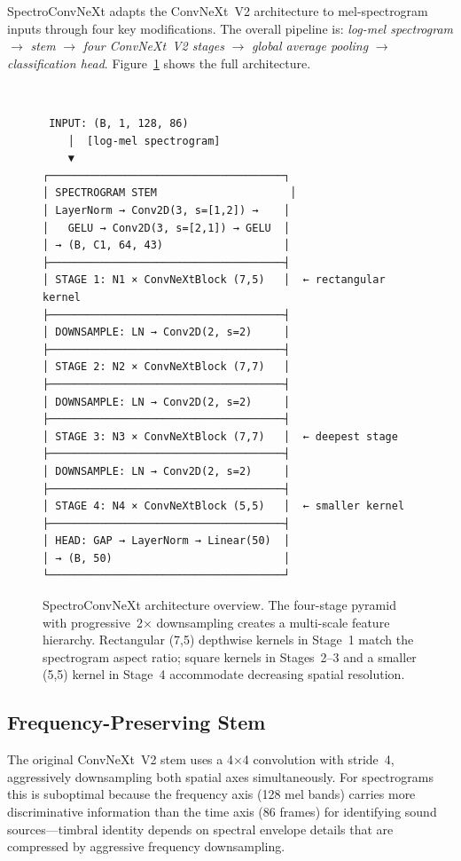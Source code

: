 \documentclass{article}
\begin{document}
SpectroConvNeXt adapts the ConvNeXt~V2 architecture to mel-spectrogram inputs
through four key modifications. The overall pipeline is: \emph{log-mel
spectrogram} $\rightarrow$ \emph{stem} $\rightarrow$ \emph{four ConvNeXt~V2
stages} $\rightarrow$ \emph{global average pooling} $\rightarrow$
\emph{classification head}. Figure~\ref{fig:arch} shows the full architecture.

\begin{figure}[h]
  \centering
  \begin{minipage}{0.92\linewidth}
  \small\tt
  \begin{verbatim}
 INPUT: (B, 1, 128, 86)
    │  [log-mel spectrogram]
    ▼
┌─────────────────────────────────────┐
│ SPECTROGRAM STEM                     │
│ LayerNorm → Conv2D(3, s=[1,2]) →    │
│   GELU → Conv2D(3, s=[2,1]) → GELU  │
│ → (B, C1, 64, 43)                   │
├─────────────────────────────────────┤
│ STAGE 1: N1 × ConvNeXtBlock (7,5)   │  ← rectangular kernel
├─────────────────────────────────────┤
│ DOWNSAMPLE: LN → Conv2D(2, s=2)     │
├─────────────────────────────────────┤
│ STAGE 2: N2 × ConvNeXtBlock (7,7)   │
├─────────────────────────────────────┤
│ DOWNSAMPLE: LN → Conv2D(2, s=2)     │
├─────────────────────────────────────┤
│ STAGE 3: N3 × ConvNeXtBlock (7,7)   │  ← deepest stage
├─────────────────────────────────────┤
│ DOWNSAMPLE: LN → Conv2D(2, s=2)     │
├─────────────────────────────────────┤
│ STAGE 4: N4 × ConvNeXtBlock (5,5)   │  ← smaller kernel
├─────────────────────────────────────┤
│ HEAD: GAP → LayerNorm → Linear(50)  │
│ → (B, 50)                           │
└─────────────────────────────────────┘
  \end{verbatim}
  \end{minipage}
  \caption{SpectroConvNeXt architecture overview. The four-stage pyramid with
  progressive~2$\times$ downsampling creates a multi-scale feature hierarchy.
  Rectangular (7,5) depthwise kernels in Stage~1 match the spectrogram aspect
  ratio; square kernels in Stages~2--3 and a smaller (5,5) kernel in Stage~4
  accommodate decreasing spatial resolution.}
  \label{fig:arch}
\end{figure}

\subsection{Frequency-Preserving Stem}

The original ConvNeXt~V2 stem uses a 4$\times$4 convolution with stride~4,
aggressively downsampling both spatial axes simultaneously. For spectrograms
this is suboptimal because the frequency axis (128 mel bands) carries more
discriminative information than the time axis (86 frames) for identifying sound
sources---timbral identity depends on spectral envelope details that are
compressed by aggressive frequency downsampling.
\end{document}
